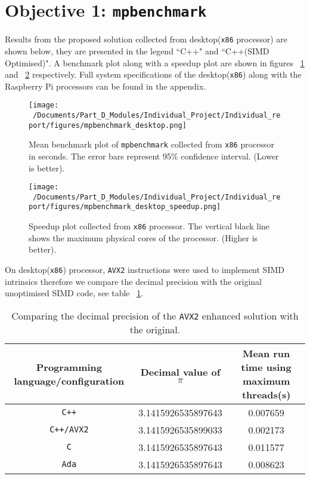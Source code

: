 \section{Objective 1: \texttt{mpbenchmark}}

Results from the proposed solution collected from desktop(\texttt{x86} processor) are shown below, they are presented in the legend ``C++" and ``C++(SIMD Optimised)". A benchmark plot along with a speedup plot are shown in figures ~\ref{fig:mpbenchmark_desktop_plot} and ~\ref{fig:mpbenchmark_desktop_speedup_plot} respectively. Full system specifications of the desktop(\texttt{x86}) along with the Raspberry Pi processors can be found in the appendix.

\begin{figure}[htbp] %
	\centering
	\texttt{[image: ~/Documents/Part\_D\_Modules/Individual\_Project/Individual\_report/figures/mpbenchmark\_desktop.png]} %
	\caption{Mean benchmark plot of \texttt{mpbenchmark} collected from \texttt{x86} processor in seconds. The error bars represent 95\% confidence interval. (Lower is better).}
	\label{fig:mpbenchmark_desktop_plot} %
\end{figure}


\begin{figure}[htbp] %
	\centering
	\texttt{[image: ~/Documents/Part\_D\_Modules/Individual\_Project/Individual\_report/figures/mpbenchmark\_desktop\_speedup.png]} %
	\caption{Speedup plot collected from \texttt{x86} processor. The vertical black line shows the maximum physical cores of the processor. (Higher is better).}
	\label{fig:mpbenchmark_desktop_speedup_plot} %
\end{figure}

On desktop(\texttt{x86}) processor, \texttt{AVX2} instructions were used to implement SIMD intrinsics therefore we compare the decimal precision with the original unoptimised SIMD code, see table ~\ref{tab:c++_avx2_pi}.

\begin{table}[htbp]
	\centering
	\begin{tabular}{|c|c|c|}
		\hline
		\textbf{Programming language/configuration} & \textbf{Decimal value of $\pi$} & \textbf{Mean run time using maximum threads(s)} \\ \hline
		\texttt{C++}             & 3.1415926535897643 &  0.007659 \\ \hline
		\texttt{C++/AVX2}   & 3.1415926535899033 &  0.002173  \\ \hline
		\texttt{C}                 & 3.1415926535897643 & 0.011577 \\ \hline
		\texttt{Ada}             & 3.1415926535897643 &  0.008623\\ \hline
	\end{tabular}
	\label{tab:c++_avx2_pi}
	\caption{Comparing the decimal precision of the \texttt{AVX2} enhanced solution with the original.}
\end{table}

